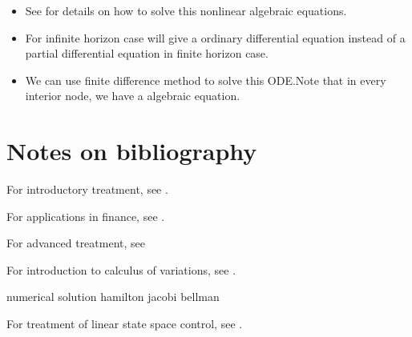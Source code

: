 \begin{refsection}
\begin{remark}\hfill
	\begin{itemize}
		\item See \cite[213]{kirk2012optimal}\cite{wiki:algebraicRiccati} for details on how to solve this nonlinear algebraic equations.
		\item For infinite horizon case will give a ordinary differential equation instead of a partial differential equation in finite horizon case. 
		\item We can use finite difference method to solve this ODE.Note that in every interior node, we have a algebraic equation.
	\end{itemize}

\end{remark}


\section{Notes on bibliography}
For introductory treatment, see \cite{luenberger1979introduction}\cite{kirk2012optimal}.

For applications in finance, see \cite{miranda2004applied}.

For advanced treatment, see \cite{fleming2006controlled}

For introduction to calculus of variations, see \cite{kirk2012optimal}.

numerical solution hamilton jacobi bellman

For treatment of linear state space control, see \cite{williams2007linear}.

\printbibliography
\end{refsection}
